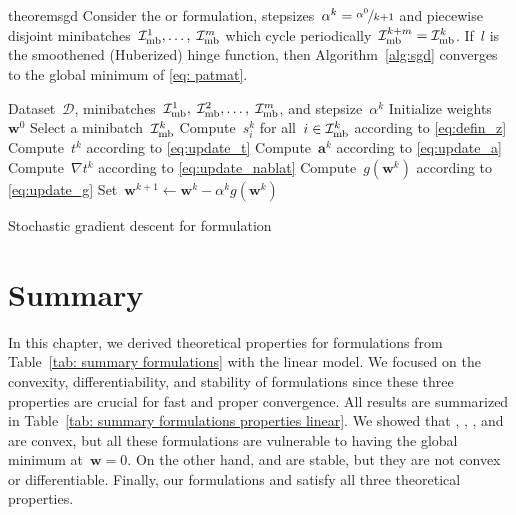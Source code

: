 \begin{restatable}{theorem}{sgd}\label{thm:sgd}
  Consider the \PatMat or \PatMatNP formulation, stepsizes~$\alpha^k = \nicefrac{\alpha^0}{k+1}$ and piecewise disjoint minibatches~$\mathcal{I}_{\text{mb}}^1, \ldots, \; \mathcal{I}_{\text{mb}}^m$ which cycle periodically~$\mathcal{I}_{\text{mb}}^{k+m} = \mathcal{I}_{\text{mb}}^k$. If~$l$ is the smoothened (Huberized) hinge function, then Algorithm~\ref{alg:sgd} converges to the global minimum of \eqref{eq: patmat}.
\end{restatable}

\begin{algorithm}
  \begin{algorithmic}[1]
    \Require Dataset~$\mathcal{D}$, minibatches~$\mathcal{I}_{\text{mb}}^1,\; \mathcal{I}_{\text{mb}}^2, \ldots, \; \mathcal{I}_{\text{mb}}^m$, and stepsize~$\alpha^k$
    \State Initialize weights~$\bm{w}^0$
    \State Select a minibatch~$\mathcal{I}_{\text{mb}}^k$
    \State Compute~$s_i^k$ for all~$i \in \mathcal{I}_{\text{mb}}^k$ according to \eqref{eq:defin_z}
    \State Compute~$t^k$ according to \eqref{eq:update_t}
    \State Compute~$\bm{a}^k$ according to \eqref{eq:update_a}
    \State Compute~$\nabla t^k$ according to \eqref{eq:update_nablat}
    \State Compute~$g(\bm{w}^k)$ according to \eqref{eq:update_g}
    \State Set~$\bm{w}^{k+1} \gets \bm{w}^k - \alpha^k g(\bm{w}^k)$
    \EndFor
  \end{algorithmic}
  \caption{Stochastic gradient descent for \PatMat formulation}
  \label{alg:sgd}
\end{algorithm}

\pagebreak

\section{Summary}

In this chapter, we derived theoretical properties for formulations from Table~\ref{tab: summary formulations} with the linear model. We focused on the convexity, differentiability, and stability of formulations since these three properties are crucial for fast and proper convergence. All results are summarized in Table~\ref{tab: summary formulations properties linear}. We showed that \TopPush, \TopPushK, \TopMeanK, and \tauFPL are convex, but all these formulations are vulnerable to having the global minimum at~$\bm{w}=0$. On the other hand, \Grill and \GrillNP are stable, but they are not convex or differentiable. Finally, our formulations \PatMat and \PatMatNP satisfy all three theoretical properties. 

